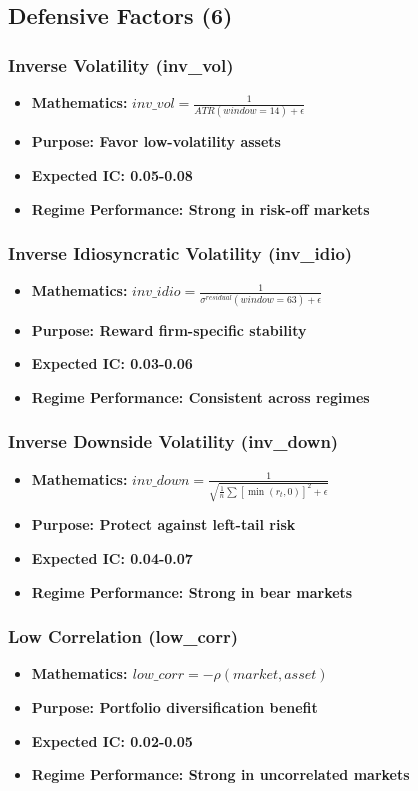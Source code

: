 \documentclass[11pt,letterpaper,openany]{book}
\begin{document}
\subsection{Defensive Factors (6)}

\subsubsection{Inverse Volatility (inv\_vol)}
\begin{itemize}
    \item \textbf{Mathematics:} $inv\_vol = \frac{1}{ATR(window=14) + \epsilon}$
    \item \textbf{Purpose: Favor low-volatility assets}
    \item \textbf{Expected IC: 0.05-0.08}
    \item \textbf{Regime Performance: Strong in risk-off markets}
\end{itemize}

\subsubsection{Inverse Idiosyncratic Volatility (inv\_idio)}
\begin{itemize}
    \item \textbf{Mathematics:} $inv\_idio = \frac{1}{\sigma^{residual}(window=63) + \epsilon}$
    \item \textbf{Purpose: Reward firm-specific stability}
    \item \textbf{Expected IC: 0.03-0.06}
    \item \textbf{Regime Performance: Consistent across regimes}
\end{itemize}

\subsubsection{Inverse Downside Volatility (inv\_down)}
\begin{itemize}
    \item \textbf{Mathematics:} $inv\_down = \frac{1}{\sqrt{\frac{1}{n}\sum[\min(r_t,0)]^2 + \epsilon}}$
    \item \textbf{Purpose: Protect against left-tail risk}
    \item \textbf{Expected IC: 0.04-0.07}
    \item \textbf{Regime Performance: Strong in bear markets}
\end{itemize}

\subsubsection{Low Correlation (low\_corr)}
\begin{itemize}
    \item \textbf{Mathematics: $low\_corr = -\rho(market, asset)$}
    \item \textbf{Purpose: Portfolio diversification benefit}
    \item \textbf{Expected IC: 0.02-0.05}
    \item \textbf{Regime Performance: Strong in uncorrelated markets}
\end{itemize}
\end{document}
